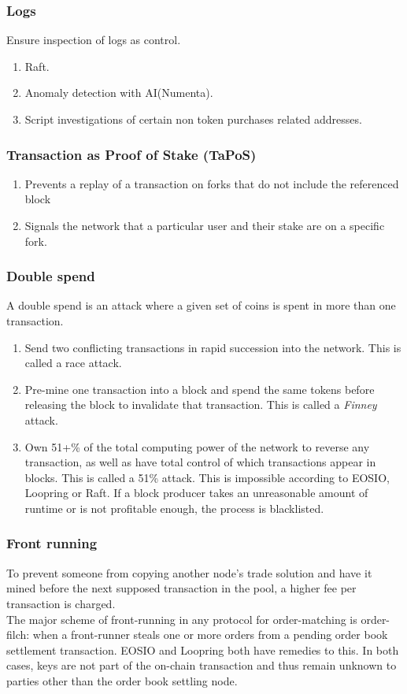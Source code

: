 \documentclass[]{article}
\begin{document}
{\subsubsection {Logs}
Ensure inspection of logs as control.
\begin{enumerate}
	\item Raft.
	\item Anomaly detection with AI(Numenta).
	\item Script investigations of certain non token purchases related addresses.
\end{enumerate}
\subsubsection{Transaction as Proof of Stake (TaPoS)}
\begin{enumerate}
	\item Prevents a replay of a transaction on forks that do not include the referenced block 
	\item Signals the network that a particular user and their stake are on a specific fork.
\end{enumerate}
\subsubsection{Double spend}
A double spend is an attack where a given set of coins is spent in more than one transaction.
\begin{enumerate}
	\item Send two conflicting transactions in rapid succession into the network. This is called a race attack. 
	\item Pre-mine one transaction into a block and spend the same tokens before releasing the block to invalidate that transaction. 
	This is called a \textit{Finney} attack.
	\item Own 51+\% of the total computing power of the network to reverse any transaction, 
	as well as have total control of which transactions appear in blocks. 
	This is called a 51\% attack.
	This is impossible according to EOSIO, Loopring or Raft.
	If a block producer takes an unreasonable amount of runtime or is not profitable enough, the process is blacklisted.\cite{7}
\end{enumerate} 

\subsubsection{Front running}
To prevent someone from copying another node's trade solution 
and have it mined before the next supposed transaction in the pool, 
a higher fee per transaction is charged.\\ 
The major scheme of front-running in any protocol for
order-matching is order-filch: when a front-runner steals
one or more orders from a pending order book settlement
transaction. EOSIO and Loopring both have remedies to this.
In both cases, keys are not part of the on-chain transaction and thus remain unknown to parties other than the order book settling node.


}
\end{document}
